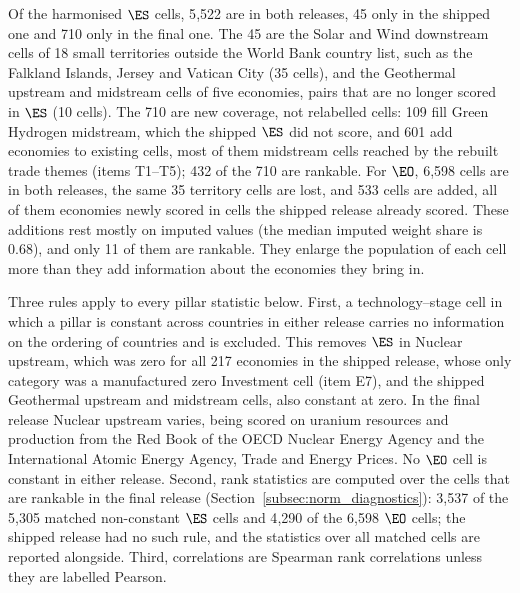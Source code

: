 Of the harmonised $\ES$ cells, 5{,}522 are in both releases, 45 only in the shipped one and 710
only in the final one. The 45 are the Solar and Wind downstream cells of 18 small territories
outside the World Bank country list, such as the Falkland Islands, Jersey and Vatican City (35
cells), and the Geothermal upstream and midstream cells of five economies, pairs that are no
longer scored in $\ES$ (10 cells). The 710 are new coverage, not relabelled cells: 109 fill Green
Hydrogen midstream, which the shipped $\ES$ did not score, and 601 add economies to existing
cells, most of them midstream cells reached by the rebuilt trade themes (items T1--T5); 432 of
the 710 are rankable. For $\EO$, 6{,}598 cells are in both releases, the same 35 territory cells
are lost, and 533 cells are added, all of them economies newly scored in cells the shipped
release already scored. These additions rest mostly on imputed values (the median imputed weight
share is 0.68), and only 11 of them are rankable. They enlarge the population of each cell more
than they add information about the economies they bring in.



Three rules apply to every pillar statistic below. First, a technology--stage cell in which a
pillar is constant across countries in either release carries no information on the ordering of
countries and is excluded. This removes $\ES$ in Nuclear upstream, which was zero for all 217
economies in the shipped release, whose only category was a manufactured zero Investment cell
(item E7), and the shipped Geothermal upstream and midstream cells, also constant at zero. In the
final release Nuclear upstream varies, being scored on uranium resources and production from the
Red Book of the OECD Nuclear Energy Agency and the International Atomic Energy Agency, Trade and
Energy Prices. No $\EO$ cell is constant in either
release. Second, rank statistics are computed over the cells that are rankable in the final
release (Section~\ref{subsec:norm_diagnostics}): 3{,}537 of the 5{,}305 matched non-constant
$\ES$ cells and 4{,}290 of the 6{,}598 $\EO$ cells; the shipped release had no such rule, and the
statistics over all matched cells are reported alongside. Third, correlations are Spearman rank
correlations unless they are labelled Pearson.

